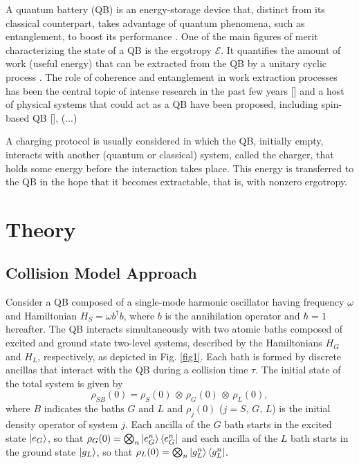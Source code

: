 \documentclass[%
reprint,
superscriptaddress,
amsmath,amssymb,
aps,
pra,
]{revtex4-2}
\begin{document}
A quantum battery (QB) is an energy-storage device that, distinct from its classical counterpart, takes advantage of quantum phenomena, such as entanglement, to boost its performance \cite{alicki2013entanglement, campaioli2024colloquium}. One of the main figures of merit characterizing the state of a QB is the ergotropy $\mathcal{E}$. It quantifies the amount of work (useful energy) that can be extracted from the QB by a unitary cyclic process \cite{allahverdyan2004maximal}. The role of coherence and entanglement in work extraction processes has been the central topic of intense research in the past few years [] and a host of physical systems that could act as a QB have been proposed, including spin-based QB [], (...) 

A charging protocol is usually considered in which the QB, initially empty, interacts with another (quantum or classical) system, called the charger, that holds some energy before the interaction takes place. This energy is transferred to the QB in the hope that it becomes extractable, that is, with nonzero ergotropy. 


\section{Theory}

\subsection{Collision Model Approach}

Consider a QB composed of a single-mode harmonic oscillator having frequency $\omega$ and Hamiltonian $H_S = \omega b^{\dagger}b$, where $b$ is the annihilation operator and $\hbar = 1$ hereafter. The QB interacts simultaneously with two atomic baths composed of excited and ground state two-level systems, described by the Hamiltonians $H_G$ and $H_L$, respectively, as depicted in Fig. \ref{fig1}. Each bath is formed by discrete ancillas that interact with the QB during a collision time $\tau$. The initial state of the total system is given by
\begin{equation}
    \rho_{SB}(0) = \rho_S(0)\, \otimes \, \rho_G(0) \, \otimes \, \rho_L(0),
\end{equation}
 where $B$ indicates the baths $G$ and $L$ and $\rho_j(0)$ ($j = S$, $G$, $L$) is the initial density operator of system $j$. Each ancilla of the $G$ bath starts in the excited state $\ket{e_G}$, so that $\rho_G(0) = \bigotimes_{n}\ket{e_G^n}\bra{e_G^n}$ and each ancilla of the $L$ bath starts in the ground state $\ket{g_L}$, so that $\rho_L(0) = \bigotimes_{n}\ket{g_L^n}\bra{g_L^n}$.
\end{document}
